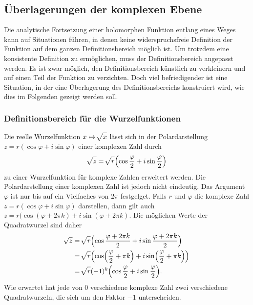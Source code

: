 %
%
%
\subsection{Überlagerungen der komplexen Ebene}


Die analytische Fortsetzung einer holomorphen Funktion entlang eines
Weges kann auf Situationen führen, in denen keine widerspruchsfreie
Definition der Funktion auf dem ganzen Definitionsbereich möglich ist.
Um trotzdem eine konsistente Definition zu ermöglichen, muss der
Definitionsbereich angepasst werden.
Es ist zwar möglich, den Definitionsbereich künstlich zu verkleinern
und auf einen Teil der Funktion zu verzichten.
Doch viel befriedigender ist eine Situation, in der eine Überlagerung
des Definitionsbereichs konstruiert wird, wie dies im Folgenden
gezeigt werden soll.

%
%
\subsubsection{Definitionsbereich für die Wurzelfunktionen}
Die reelle Wurzelfunktion $x\mapsto \!\sqrt{x\mathstrut}$ lässt
sich in der Polardarstellung $z=r(\cos\varphi+i\sin\varphi)$ einer
komplexen Zahl durch
\[
\!\sqrt{z\mathstrut}
=
\!\sqrt{r\mathstrut}
\Bigl(\cos\frac{\varphi}2+i\sin\frac{\varphi}2\Bigr)
\]
zu einer Wurzelfunktion für komplexe Zahlen erweitert werden.
Die Polardarstellung einer komplexen Zahl ist jedoch nicht eindeutig.
Das Argument $\varphi$ ist nur bis auf ein Vielfaches von $2\pi$
festgelget.
Falls $r$ und $\varphi$ die komplexe Zahl
$
z
=
r(\cos\varphi+i\sin\varphi)
$ 
darstellen, dann gilt auch
$
z
=
r(\cos(\varphi+2\pi k) + i\sin(\varphi+2\pi k)
$.
Die möglichen Werte der Quadratwurzel sind daher
\begin{align*}
\!\sqrt{z}
&=
\!\sqrt{r\mathstrut}\Bigl(
\cos\frac{\varphi+2\pi k}{2}
+
i
\sin\frac{\varphi+2\pi k}{2}
\Bigr)
\\
&=
\!\sqrt{r\mathstrut}\Bigl(
\cos\Bigl(\frac{\varphi}2+\pi k\Bigr)
+
i
\sin\Bigl(\frac{\varphi}2+\pi k\Bigr)
\Bigr)
\\
&=
\!\sqrt{r\mathstrut}
(-1)^k
\Bigl(\cos\frac{\varphi}2+i\sin\frac{\varphi}2\Bigr).
\end{align*}
Wie erwartet hat jede von $0$ verschiedene komplexe Zahl zwei
verschiedene Quadratwurzeln, die sich um den Faktor $-1$ 
unterscheiden.

